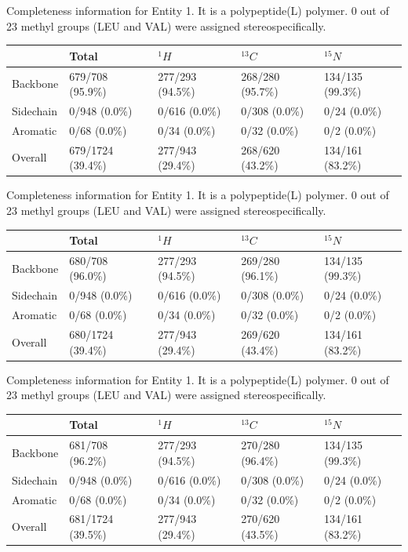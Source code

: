 Completeness information for Entity 1. It is a polypeptide(L) polymer. 0 out of 23 methyl groups (LEU and VAL) were assigned stereospecifically.\begin{longtable}{|l|l|l|l|l|}
\hline
  & Total & $^{1}H$ & $^{13}C$ & $^{15}N$\\\hline
Backbone & 679/708 (95.9\%)& 277/293 (94.5\%)& 268/280 (95.7\%)& 134/135 (99.3\%) \\
\hline
Sidechain & 0/948 (0.0\%)& 0/616 (0.0\%)& 0/308 (0.0\%)& 0/24 (0.0\%) \\
\hline
Aromatic & 0/68 (0.0\%)& 0/34 (0.0\%)& 0/32 (0.0\%)& 0/2 (0.0\%) \\
\hline
Overall & 679/1724 (39.4\%)& 277/943 (29.4\%)& 268/620 (43.2\%)& 134/161 (83.2\%) \\
\hline
\end{longtable}
Completeness information for Entity 1. It is a polypeptide(L) polymer. 0 out of 23 methyl groups (LEU and VAL) were assigned stereospecifically.\begin{longtable}{|l|l|l|l|l|}
\hline
  & Total & $^{1}H$ & $^{13}C$ & $^{15}N$\\\hline
Backbone & 680/708 (96.0\%)& 277/293 (94.5\%)& 269/280 (96.1\%)& 134/135 (99.3\%) \\
\hline
Sidechain & 0/948 (0.0\%)& 0/616 (0.0\%)& 0/308 (0.0\%)& 0/24 (0.0\%) \\
\hline
Aromatic & 0/68 (0.0\%)& 0/34 (0.0\%)& 0/32 (0.0\%)& 0/2 (0.0\%) \\
\hline
Overall & 680/1724 (39.4\%)& 277/943 (29.4\%)& 269/620 (43.4\%)& 134/161 (83.2\%) \\
\hline
\end{longtable}
Completeness information for Entity 1. It is a polypeptide(L) polymer. 0 out of 23 methyl groups (LEU and VAL) were assigned stereospecifically.\begin{longtable}{|l|l|l|l|l|}
\hline
  & Total & $^{1}H$ & $^{13}C$ & $^{15}N$\\\hline
Backbone & 681/708 (96.2\%)& 277/293 (94.5\%)& 270/280 (96.4\%)& 134/135 (99.3\%) \\
\hline
Sidechain & 0/948 (0.0\%)& 0/616 (0.0\%)& 0/308 (0.0\%)& 0/24 (0.0\%) \\
\hline
Aromatic & 0/68 (0.0\%)& 0/34 (0.0\%)& 0/32 (0.0\%)& 0/2 (0.0\%) \\
\hline
Overall & 681/1724 (39.5\%)& 277/943 (29.4\%)& 270/620 (43.5\%)& 134/161 (83.2\%) \\
\hline
\end{longtable}
